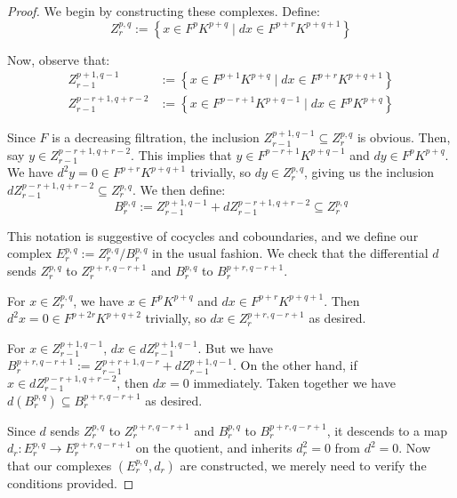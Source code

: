\begin{proof}
    We begin by constructing these complexes. Define:
    $$
    Z^{p,q}_r:=\left\{x\in F^p K^{p+q}\mid dx\in F^{p+r}K^{p+q+1}\right\}
    $$
    
    Now, observe that:
    \begin{align*}
    Z^{p+1,q-1}_{r-1}&:= \left\{x\in F^{p+1} K^{p+q}\mid dx\in F^{p+r}K^{p+q+1}\right\} \\
    Z_{r-1}^{p-r+1,q+r-2} &:= \left\{x\in F^{p-r+1} K^{p+q-1}\mid dx\in F^{p}K^{p+q}\right\} 
    \end{align*}
    
    \noindent Since $F$ is a decreasing filtration, the inclusion $Z_{r-1}^{p+1,q-1} \subseteq Z_r^{p,q}$ is obvious. Then, say $y\in Z_{r-1}^{p-r+1,q+r-2}$. This implies that $y\in F^{p-r+1} K^{p+q-1}$ and $dy\in F^{p} K^{p+q}$. We have $d^2y =0\in F^{p+r}K^{p+q+1}$ trivially, so $dy \in Z_r^{p,q}$, giving us the inclusion $dZ_{r-1}^{p-r+1,q+r-2}\subseteq Z_r^{p,q}$. We then define:
    $$
    B_r^{p,q} := Z_{r-1}^{p+1,q-1} + dZ_{r-1}^{p-r+1,q+r-2} \subseteq Z_r^{p,q}
    $$
    
    \noindent This notation is suggestive of cocycles and coboundaries, and we define our complex $E_r^{p,q}:= Z_r^{p,q}/B_r^{p,q}$ in the usual fashion. We check that the differential $d$ sends $Z_r^{p,q}$ to $Z_r^{p+r,q-r+1}$ and $B_r^{p,q}$ to $B_r^{p+r,q-r+1}$. 

    \medskip
    
    \noindent For $x\in Z^{p,q}_r$, we have $x\in F^p K^{p+q}$ and $dx \in F^{p+r}K^{p+q+1}$. Then $d^2x = 0\in F^{p+2r}K^{p+q+2}$ trivially, so $dx\in Z_r^{p+r, q-r+1}$ as desired. 

    \medskip
    
    \noindent For $x\in Z_{r-1}^{p+1,q-1}$, $dx\in dZ_{r-1}^{p+1,q-1}$. But we have $B_r^{p+r,q-r+1}:= Z_{r-1}^{p+r+1, q-r} + dZ_{r-1}^{p+1,q-1}$. On the other hand, if $x\in dZ_{r-1}^{p-r+1,q+r-2}$, then $dx=0$ immediately. Taken together we have $d\left(B_r^{p,q}\right) \subseteq B_r^{p+r,q-r+1}$ as desired. 

    \medskip

    \noindent Since $d$ sends $Z_r^{p,q}$ to $Z_r^{p+r,q-r+1}$ and $B_r^{p,q}$ to $B_r^{p+r,q-r+1}$, it descends to a map $d_r:E_r^{p,q}\to E_r^{p+r,q-r+1}$ on the quotient, and inherits $d_r^2=0$ from $d^2=0$. Now that our complexes $\left(E_r^{p,q},d_r\right)$ are constructed, we merely need to verify the conditions provided.


\end{proof}
